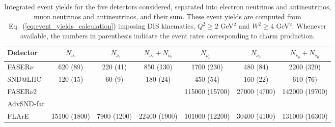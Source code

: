 \begin{table}[t]
  \centering
  \small
  \renewcommand{\arraystretch}{1.70}
\begin{tabularx}{\textwidth}{X|c|c|c|c|c|c}
\toprule
Detector & $\quad$ $N_{\nu_e}$ $\quad$ &$\quad$ $N_{\bar{\nu}_e}$$\quad$   &   $N_{\nu_e} + N_{\bar{\nu}_e}$ &
$\quad$$N_{\nu_\mu}$ $\quad$ & $\quad$ $N_{\bar{\nu}_\mu}$ $\quad$  &   $N_{\nu_\mu} + N_{\bar{\nu}_\mu}$ \\
\midrule
\midrule
FASER$\nu$  & 620 (89)    & 220 (41)  & 850 (130)  &  1700 (230)  &  480 (84)  &  2200 (320) \\
SND@LHC  &  120 (15)  & 60 (9)    &180 (24)   &  450 (54) & 160 (22)   &  610  (76)\\
\midrule
\midrule
FASER$\nu$2  &    &    &   & 115000 (15700)  & 27000 (4700)    & 142000 (19700)   \\
AdvSND-far  &    &    &   &   &    &    \\
FLArE & 15100 (1800) & 7900 (1200)   &  22400 (1900) &  101000 (12200)&   30400 (4100) &   131000 (16300) \\
  \bottomrule
\end{tabularx}
\vspace{0.2cm}
\caption{\small Integrated event yields for the five detectors considered,
  separated into electron neutrinos and antineutrinos,
  muon neutrinos and antineutrinos, and their sum.
  These event yields are computed from Eq.~(\ref{eq:event_yields_calculation})
  imposing DIS kinematics, $Q^2 \ge 2$ GeV$^2$ and $W^2 \ge 4$ GeV$^2$.
  Whenever available, the
  numbers in parenthesis indicate the event rates corresponding to charm
  production.
  \label{tab:integrated_rates}
}
\end{table}
